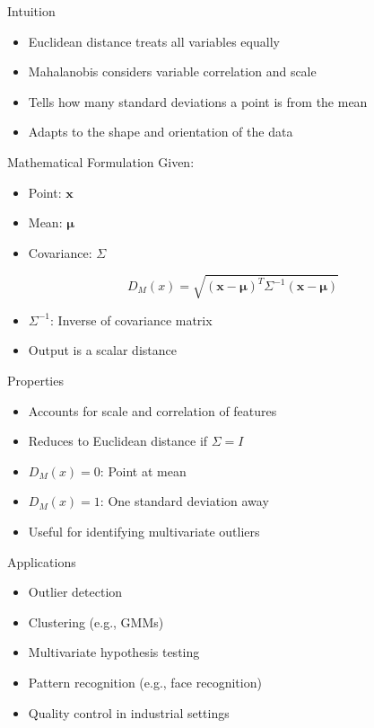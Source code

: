 \documentclass{beamer}
\begin{document}
\begin{frame}{Intuition}
  \begin{itemize}
    \item Euclidean distance treats all variables equally
    \item Mahalanobis considers variable correlation and scale
    \item Tells how many standard deviations a point is from the mean
    \item Adapts to the shape and orientation of the data
  \end{itemize}
\end{frame}
\begin{frame}{Mathematical Formulation}
  Given:
  \begin{itemize}
    \item Point: \( \mathbf{x} \)
    \item Mean: \( \boldsymbol{\mu} \)
    \item Covariance: \( \Sigma \)
  \end{itemize}
  \vspace{0.5em}
  \[
    D_M(x) = \sqrt{(\mathbf{x} - \boldsymbol{\mu})^T \Sigma^{-1} (\mathbf{x} - \boldsymbol{\mu})}
  \]
  \begin{itemize}
    \item \( \Sigma^{-1} \): Inverse of covariance matrix
    \item Output is a scalar distance
  \end{itemize}
\end{frame}
\begin{frame}{Properties}
  \begin{itemize}
    \item Accounts for scale and correlation of features
    \item Reduces to Euclidean distance if \( \Sigma = I \)
    \item \( D_M(x) = 0 \): Point at mean
    \item \( D_M(x) = 1 \): One standard deviation away
    \item Useful for identifying multivariate outliers
  \end{itemize}
\end{frame}
\begin{frame}{Applications}
  \begin{itemize}
    \item Outlier detection
    \item Clustering (e.g., GMMs)
    \item Multivariate hypothesis testing
    \item Pattern recognition (e.g., face recognition)
    \item Quality control in industrial settings
  \end{itemize}
\end{frame}
\end{document}
